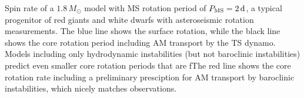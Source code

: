  \label{fig:MRI1p8rot} Spin rate of a $1.8 \, M_\odot$ model with MS rotation period of $P_{\rm MS} = 2 \, {\rm d}$, a typical progenitor of red giants and white dwarfs with asteroseismic rotation measurements. The blue line shows the surface rotation, while the black line shows the core rotation period including AM transport by the TS dynamo. Models including only hydrodynamic instabilities (but not baroclinic instabilities) predict even smaller core rotation periods that are fThe red line shows the core rotation rate including a preliminary presciption for AM transport by baroclinic instabilities, which nicely matches observations.